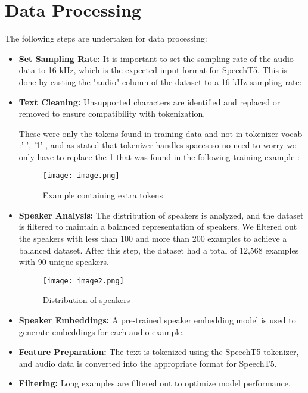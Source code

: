 \documentclass[12pt]{article}
\begin{document}
\section*{Data Processing}
The following steps are undertaken for data processing:
\begin{itemize}
\item \textbf {Set Sampling Rate:} It is important to set the sampling rate of the audio data to 16 kHz, which is the expected input format for SpeechT5. This is done by casting the "audio" column of the dataset to a 16 kHz sampling rate:

\item \textbf{Text Cleaning:} Unsupported characters are identified and replaced or removed to ensure compatibility with tokenization.

These were only the tokens found in training data and not in tokenizer vocab :{' ', '1'} , and as stated that tokenizer handles spaces so no need to worry we only have to replace the 1 that was found in the following training example : 
\begin{figure}
    \centering
    \texttt{[image: image.png]}
    \caption{Example containing extra tokens}
    \label{fig:enter-label}
\end{figure}
\item \textbf{Speaker Analysis:} The distribution of speakers is analyzed, and the dataset is filtered to maintain a balanced representation of speakers. 
We filtered out the speakers with less than 100 and more than 200 examples to achieve a balanced dataset. After this step, the dataset had a total of 12,568 examples with 90 unique speakers.

\begin{figure}[h]
    \centering
    \texttt{[image: image2.png]}
    \caption{Distribution of speakers}
    \label{fig:speaker-distribution}
\end{figure}



\item \textbf{Speaker Embeddings:} A pre-trained speaker embedding model is used to generate embeddings for each audio example.
\item \textbf{Feature Preparation:} The text is tokenized using the SpeechT5 tokenizer, and audio data is converted into the appropriate format for SpeechT5.
\item \textbf{Filtering:} Long examples are filtered out to optimize model performance.
\end{itemize}
\end{document}
